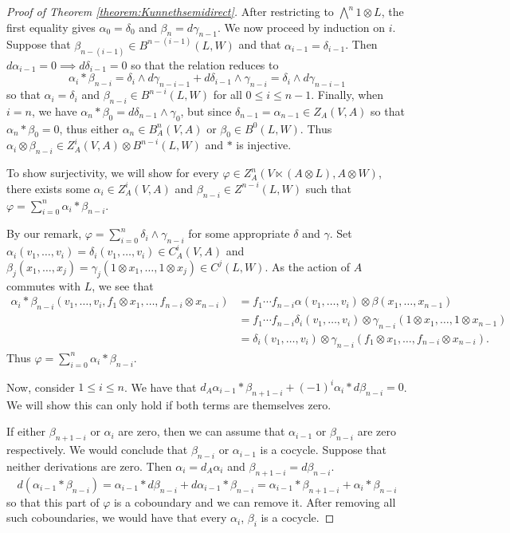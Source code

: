 \documentclass[10pt,a4paper]{amsart}
\newcommand{\vphi}{{\varphi}}
\begin{document}
\begin{proof}[Proof of Theorem \ref{theorem:Kunnethsemidirect}]
After restricting to $\bigwedge^{n} 1 \otimes L$, the first equality gives $\alpha_0 = \delta_0$ and $\beta_n = d\gamma_{n-1}$. We now proceed by induction on $i$. Suppose that $\beta_{n-(i-1)} \in B^{n-(i-1)}(L,W)$ and that $\alpha_{i-1} = \delta_{i-1}$. Then $d \alpha_{i-1} =0 \implies d\delta_{i-1}=0$ so that the relation reduces to 
\[
\alpha_i \ast \beta_{n-i} = \delta_{i} \wedge d\gamma_{n-i-1} +  d\delta_{i-1} \wedge \gamma_{n-i} = \delta_i \wedge d \gamma_{n-i-1}
\]
so that $\alpha_i = \delta_i$ and $\beta_{n-i} \in B^{n-i}(L,W)$ for all $0 \leq i \leq n-1$. Finally, when $i =n$, we have $\alpha_n \ast \beta_0 = d \delta_{n-1} \wedge \gamma_0$, but since $\delta_{n-1} = \alpha_{n-1} \in Z_A(V, A)$ so that $\alpha_n \ast \beta_0 =0$, thus either $\alpha_n \in B^n_A(V, A)$ or $\beta_0 \in B^0(L, W)$. Thus $\alpha_i \otimes \beta_{n-i} \in Z_A^i(V,A) \otimes B^{n-i}(L,W)$ and $\ast$ is injective. 

To show surjectivity, we will show for every $\vphi \in Z_A^{n}(V \ltimes (A \otimes L), A \otimes W)$, there exists some $\alpha_i \in Z_A^i(V, A)$ and $ \beta_{n-i} \in Z^{n-i}(L, W)$ such that $\vphi = \sum_{i=0}^n \alpha_i \ast \beta_{n-i}$. 

By our remark, $\vphi = \sum_{i=0}^n \delta_i \wedge \gamma_{n-i}$ for some appropriate $\delta$ and $\gamma$. Set $\alpha_i(v_1, \dots, v_i) = \delta_i(v_1, \dots, v_i)\in C^i_A(V,A)$ and $\beta_j (x_1, \dots, x_j) = \gamma_j(1\otimes x_1, \dots, 1\otimes x_j)\in C^j(L, W)$. As the action of $A$ commutes with $L$, we see that 
\begin{align*}
\alpha_i \ast \beta_{n-i} (v_1, \dots, v_i, f_1 \otimes x_1, \dots, f_{n-i} \otimes x_{n-i}) & = f_1 \cdots f_{n-i}\alpha(v_1, \dots, v_i) \otimes \beta(x_1, \dots, x_{n-1})\\
& = f_1 \cdots f_{n-i} \delta_i(v_1, \dots, v_i) \otimes \gamma_{n-i}(1 \otimes x_1, \dots, 1 \otimes x_{n-1})\\
& = \delta_i(v_1, \dots, v_i) \otimes \gamma_{n-i}(f_1 \otimes x_1, \dots, f_{n-i} \otimes x_{n-i}).
\end{align*}
Thus $\vphi = \sum_{i=0}^n \alpha_i \ast \beta_{n-i}$. 


Now, consider $1 \leq i \leq n$. We have that $d_A\alpha_{i-1} \ast \beta_{n+1-i} + (-1)^i\alpha_{i} \ast d\beta_{n-i}=0$. We will show this can only hold if both terms are themselves zero. 

If either $\beta_{n+1-i}$ or $\alpha_i$ are zero, then we can assume that $\alpha_{i-1}$ or $\beta_{n-i}$ are zero respectively. We would conclude that $\beta_{n-i}$ or $\alpha_{i-1}$ is a cocycle.  Suppose that neither derivations are zero. Then $\alpha_i = d_A\alpha_i$ and $\beta_{n+1-i} = d \beta_{n-i}$. 
\[
d(\alpha_{i-1} \ast \beta_{n-i}) = \alpha_{i-1} \ast d \beta_{n-i} + d\alpha_{i-1} \ast \beta_{n-i} = \alpha_{i-1} \ast \beta_{n+1-i} + \alpha_i \ast \beta_{n-i}
\]
so that this part of $\vphi$ is a coboundary and we can remove it. After removing all such coboundaries, we would have that every $\alpha_i$, $\beta_i$ is a cocycle. 


\end{proof}
\end{document}
